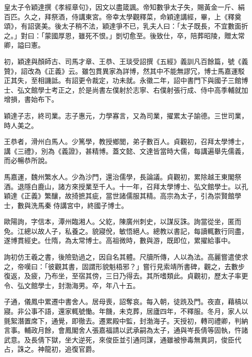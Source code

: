 \begin{pinyinscope}
 皇太子令穎達撰《孝經章句》，因文以盡箴諷。帝知數爭太子失，賜黃金一斤、絹百匹。久之，拜祭酒，侍講東宮。帝幸太學觀釋菜，命穎達講經，畢，上《釋奠頌》，有詔褒美。後太子稍不法，穎達爭不已，乳夫人曰：「太子既長，不宜數面折之。」對曰：「蒙國厚恩，雖死不恨。」剴切愈至。後致仕，卒，陪葬昭陵，贈太常卿，謚曰憲。



 初，穎達與顏師古、司馬才章、王恭、王琰受詔撰《五經》義訓凡百餘篇，號《義贊》，詔改為《正義》云。雖包貫異家為詳博，然其中不能無謬冗，博士馬嘉運駁正其失，至相譏詆。有詔更令裁定，功未就。永徽二年，詔中書門下與國子三館博士、弘文館學士考正之，於是尚書左僕射於志寧、右僕射張行成、侍中高季輔就加增損，書始布下。



 穎達子志，終司業。志子惠元，力學寡言，又為司業，擢累太子諭德。三世司業，時人美之。



 王恭者，滑州白馬人。少篤學，教授鄉閭，弟子數百人。貞觀初，召拜太學博士，講《三禮》，別為《義證》，甚精博。蓋文懿、文達皆當時大儒，每講遍舉先儒義，而必暢恭所說。



 馬嘉運，魏州繁水人。少為沙門，還治儒學，長論議。貞觀初，累除越王東閣祭酒。退隱白鹿山，諸方來授業至千人。十一年，召拜太學博士、弘文館學士。以孔穎達《正義》繁釀，故掎摭其疵，當世諸儒服其精。高宗為太子，引為崇賢館學士，數與洗馬秦侍講宮中，終國子博士。



 歐陽詢，字信本，潭州臨湘人。父紇，陳廣州刺史，以謀反誅。詢當從坐，匿而免。江總以故人子，私養之。貌寢侻，敏悟絕人。總教以書記，每讀輒數行同盡，遂博貫經史。仕隋，為太常博士。高祖微時，數與游，既即位，累擢給事中。



 詢初仿王羲之書，後險勁過之，因自名其體。尺牘所傳，人以為法。高麗嘗遣使求之，帝嘆曰：「彼觀其書，固謂形貌魁梧邪？」嘗行見索靖所書碑，觀之，去數步復返，及疲，乃布坐，至宿其傍，三日乃得去。其所嗜類此。貞觀初，歷太子率更令、弘文館學士，封渤海男。卒，年八十五。



 子通，儀鳳中累遷中書舍人。居母喪，詔奪哀。每入朝，徒跣及門。夜直，藉槁以寢。非公事不語，還家輒號慟。年饑，未克葬，居廬四年，不釋服。冬月，家人以氈絮潛置席下，通覺，即徹去。遷累殿中監，封渤海子。天授初，轉司禮卿，判納言事。輔政月餘，會鳳閣舍人張嘉福請以武承嗣為太子，通與岑長倩等固執，忤諸武意。及長倩下獄，坐大逆死，來俊臣並引通同謀，通雖被慘毒無異詞，俊臣代占，誅之。神龍初，追復官爵。




\end{pinyinscope}
